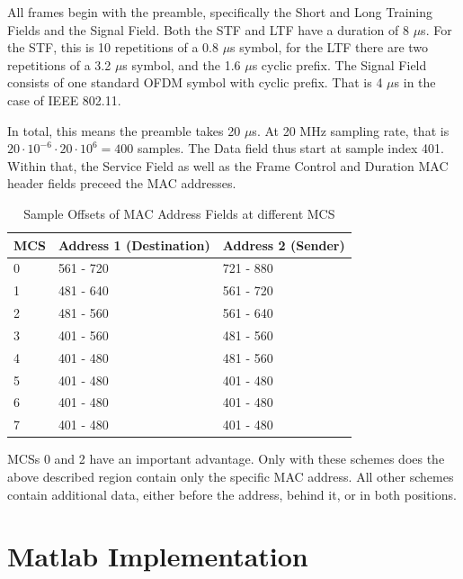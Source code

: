 All frames begin with the preamble, specifically the Short and Long Training Fields and the Signal Field. Both the STF and LTF have a duration of 8 $\mu$s. For the STF, this is 10 repetitions of a 0.8 $\mu$s symbol, for the LTF there are two repetitions of a 3.2 $\mu$s symbol, and the 1.6 $\mu$s cyclic prefix. The Signal Field consists of one standard \gls{OFDM} symbol with cyclic prefix. That is 4 $\mu$s in the case of IEEE 802.11.

In total, this means the preamble takes 20 $\mu$s. At 20 MHz sampling rate, that is $ 20 \cdot 10^{-6} \cdot 20 \cdot 10^6 = 400 $ samples. The Data field thus start at sample index 401. Within that, the Service Field as well as the Frame Control and Duration MAC header fields preceed the MAC addresses.\\

\begin{table}[ht]
	\centering
	\begin{tabular}{|p{2.5cm}|p{4.5cm}|p{4.5cm}|}
		\hline
		\textbf{MCS} & \textbf{Address 1 (Destination)} & \textbf{Address 2 (Sender)} \\ \hline
		0 & 561 - 720 & 721 - 880 \\ \hline
		1 & 481 - 640 & 561 - 720 \\ \hline
		2 & 481 - 560 & 561 - 640 \\ \hline
		3 & 401 - 560 & 481 - 560 \\ \hline
		4 & 401 - 480 & 481 - 560 \\ \hline
		5 & 401 - 480 & 401 - 480 \\ \hline
		6 & 401 - 480 & 401 - 480 \\ \hline
		7 & 401 - 480 & 401 - 480 \\ \hline
	\end{tabular}
	\caption{Sample Offsets of MAC Address Fields at different MCS}
	\label{tbl:sample-offsets}
\end{table}

\glspl{MCS} 0 and 2 have an important advantage. Only with these schemes does the above described region contain only the specific MAC address. All other schemes contain additional data, either before the address, behind it, or in both positions.



\section{Matlab Implementation}\label{sec:matlab-impl}

